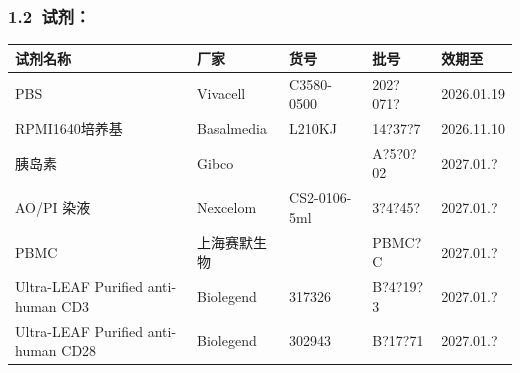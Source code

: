 \documentclass[UTF8,10pt,a4paper,fontset=fandol]{ctexart}
\newcommand{\fieldvalue}[1]{#1}
\newcommand{\handwritten}[1]{#1}
\begin{document}
\subsubsection*{1.2\ 试剂：}

\begin{center}
\small
\begin{tabular}{|p{4.0cm}|p{3.8cm}|p{3.0cm}|p{3.0cm}|p{2.5cm}|}
\hline
试剂名称 & 厂家 & 货号 & 批号 & 效期至\\
\hline
PBS & Vivacell & C3580-0500 &
\fieldvalue{\handwritten{202?071?}} &
\fieldvalue{\handwritten{2026.01.19}}\\
\hline
RPMI1640培养基 & Basalmedia & L210KJ &
\fieldvalue{\handwritten{14?37?7}} &
\fieldvalue{\handwritten{2026.11.10}}\\
\hline
胰岛素 & Gibco &  &
\fieldvalue{\handwritten{A?5?0?02}} &
\fieldvalue{\handwritten{2027.01.?}}\\
\hline
AO/PI 染液 & Nexcelom & CS2-0106-5ml &
\fieldvalue{\handwritten{3?4?45?}} &
\fieldvalue{\handwritten{2027.01.?}}\\
\hline
PBMC & 上海赛默生物 &  &
\fieldvalue{\handwritten{PBMC?C}} &
\fieldvalue{\handwritten{2027.01.?}}\\
\hline
Ultra-LEAF Purified anti-human CD3 & Biolegend & 317326 &
\fieldvalue{\handwritten{B?4?19?3}} &
\fieldvalue{\handwritten{2027.01.?}}\\
\hline
Ultra-LEAF Purified anti-human CD28 & Biolegend & 302943 &
\fieldvalue{\handwritten{B?17?71}} &
\fieldvalue{\handwritten{2027.01.?}}\\
\hline
\end{tabular}
\end{center}
\end{document}
